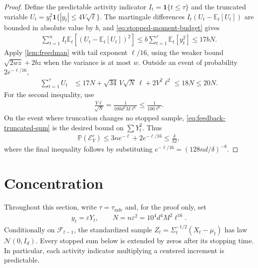 \documentclass[11pt]{article}
\newcommand{\E}{\mathbb E}
\newcommand{\Pp}{\mathbb P}
\newcommand{\F}{\mathcal F}
\newcommand{\N}{\mathcal N}
\newcommand{\1}{\mathbf 1}
\newcommand{\eps}{\varepsilon}
\begin{document}
\begin{proof}
    Define the predictable activity indicator $I_t=\1\{t\leq\tau\}$ and
    the truncated variable
    $U_t=y_t^2\1\{|y_t|\leq4V\sqrt\ell\}$.
    The martingale differences $I_t(U_t-\E_t[U_t])$ are bounded in
    absolute value by $b$, and \eqref{eq:stopped-moment-budget} gives
    \begin{align}
        \sum_{t=1}^n I_t\E_t[(U_t-\E_t[U_t])^2]
        \leq b\sum_{t=1}^\tau\E_t[y_t^2]
        \leq17bN.
    \end{align}
    Apply \cref{lem:freedman} with tail exponent $\ell/16$, using the
    weaker bound $\sqrt{2wz}+2bz$ when the variance is at most $w$.
    Outside an event of probability $2e^{-\ell/16}$,
    \begin{align}
        \sum_{t=1}^\tau U_t
         & \leq17N+\sqrt{34}\,V\sqrt N\,\ell+2V^2\ell^2
        \leq18N\leq20N.
        \label{eq:feedback-truncated-sum}
    \end{align}
    For the second inequality, use
    \begin{align}
        \frac{V\ell}{\sqrt N}
        =\frac{1}{100d^2M\ell^6}
        \leq\frac{1}{100\ell^6}.
        \label{eq:feedback-cap-to-budget}
    \end{align}
    On the event where truncation changes no stopped sample,
    \eqref{eq:feedback-truncated-sum} is the desired bound on
    $\sum Y_t^2$. Thus
    \begin{align}
        \Pp(\mathcal E_Y^c)
        \leq3ne^{-\ell}+2e^{-\ell/16}
        \leq\frac{\delta}{32},
    \end{align}
    where the final inequality follows by substituting
    $e^{-\ell/16}=(128nd/\delta)^{-8}$.
\end{proof}

\section{Concentration}
\label{app:concentration}
Throughout this section, write $\tau=\tau_{\mathrm{safe}}$ and, for the
proof only, set
\begin{align}
    y_t=\eps Y_t,
    \qquad N=n\eps^2=10^4d^4M^2\ell^{16}.
    \label{eq:normalised-feedback}
\end{align}
Conditionally on $\F_{t-1}$, the standardized sample
$Z_t=\Sigma_t^{-1/2}(X_t-\mu_t)$ has law $\N(0,I_d)$.
Every stopped sum below is extended by zeros after its stopping time.
In particular, each activity indicator multiplying a centered increment
is predictable.
\end{document}
